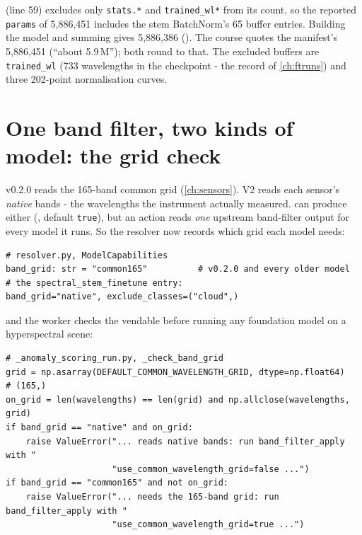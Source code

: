 \begin{sourcenote}
 (line 59) excludes only \texttt{stats.*} and \texttt{trained\_wl*} from its count,
so the reported \texttt{params} of 5,886,451 includes the stem BatchNorm's 65 buffer entries. Building the model and
summing  gives 5,886,386 (). The course
quotes the manifest's 5,886,451 (``about 5.9\,M''); both round to that. The excluded buffers are \texttt{trained\_wl}
(733 wavelengths in the checkpoint - the record of \cref{ch:ftruns}) and three 202-point normalisation curves.
\end{sourcenote}

\section{One band filter, two kinds of model: the grid check}\label{sec:shipping:grid}

v0.2.0 reads the 165-band common grid (\cref{ch:sensors}). V2 reads each sensor's \emph{native} bands - the wavelengths
the instrument actually measured.  can produce either (,
default \texttt{true}), but an  action reads \emph{one} upstream band-filter output for every
model it runs. So the resolver now records which grid each model needs:

\begin{lstlisting}
# resolver.py, ModelCapabilities
band_grid: str = "common165"          # v0.2.0 and every older model
# the spectral_stem_finetune entry:
band_grid="native", exclude_classes=("cloud",)
\end{lstlisting}

and the worker checks the vendable before running any foundation model on a hyperspectral scene:

\begin{lstlisting}
# _anomaly_scoring_run.py, _check_band_grid
grid = np.asarray(DEFAULT_COMMON_WAVELENGTH_GRID, dtype=np.float64)     # (165,)
on_grid = len(wavelengths) == len(grid) and np.allclose(wavelengths, grid)
if band_grid == "native" and on_grid:
    raise ValueError("... reads native bands: run band_filter_apply with "
                     "use_common_wavelength_grid=false ...")
if band_grid == "common165" and not on_grid:
    raise ValueError("... needs the 165-band grid: run band_filter_apply with "
                     "use_common_wavelength_grid=true ...")
\end{lstlisting}

